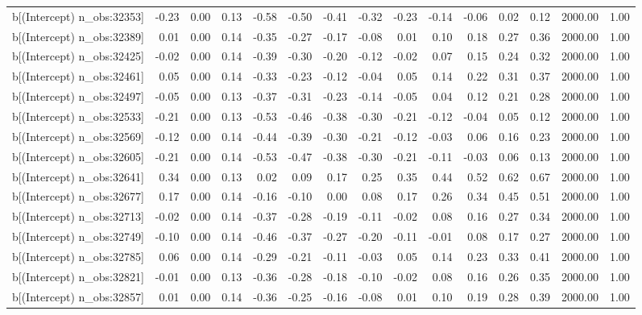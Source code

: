 \begin{table}[ht]
\begin{tabular}{rrrrrrrrrrrrrrr}
  b[(Intercept) n\_obs:32353] & -0.23 & 0.00 & 0.13 & -0.58 & -0.50 & -0.41 & -0.32 & -0.23 & -0.14 & -0.06 & 0.02 & 0.12 & 2000.00 & 1.00 \\ 
  b[(Intercept) n\_obs:32389] & 0.01 & 0.00 & 0.14 & -0.35 & -0.27 & -0.17 & -0.08 & 0.01 & 0.10 & 0.18 & 0.27 & 0.36 & 2000.00 & 1.00 \\ 
  b[(Intercept) n\_obs:32425] & -0.02 & 0.00 & 0.14 & -0.39 & -0.30 & -0.20 & -0.12 & -0.02 & 0.07 & 0.15 & 0.24 & 0.32 & 2000.00 & 1.00 \\ 
  b[(Intercept) n\_obs:32461] & 0.05 & 0.00 & 0.14 & -0.33 & -0.23 & -0.12 & -0.04 & 0.05 & 0.14 & 0.22 & 0.31 & 0.37 & 2000.00 & 1.00 \\ 
  b[(Intercept) n\_obs:32497] & -0.05 & 0.00 & 0.13 & -0.37 & -0.31 & -0.23 & -0.14 & -0.05 & 0.04 & 0.12 & 0.21 & 0.28 & 2000.00 & 1.00 \\ 
  b[(Intercept) n\_obs:32533] & -0.21 & 0.00 & 0.13 & -0.53 & -0.46 & -0.38 & -0.30 & -0.21 & -0.12 & -0.04 & 0.05 & 0.12 & 2000.00 & 1.00 \\ 
  b[(Intercept) n\_obs:32569] & -0.12 & 0.00 & 0.14 & -0.44 & -0.39 & -0.30 & -0.21 & -0.12 & -0.03 & 0.06 & 0.16 & 0.23 & 2000.00 & 1.00 \\ 
  b[(Intercept) n\_obs:32605] & -0.21 & 0.00 & 0.14 & -0.53 & -0.47 & -0.38 & -0.30 & -0.21 & -0.11 & -0.03 & 0.06 & 0.13 & 2000.00 & 1.00 \\ 
  b[(Intercept) n\_obs:32641] & 0.34 & 0.00 & 0.13 & 0.02 & 0.09 & 0.17 & 0.25 & 0.35 & 0.44 & 0.52 & 0.62 & 0.67 & 2000.00 & 1.00 \\ 
  b[(Intercept) n\_obs:32677] & 0.17 & 0.00 & 0.14 & -0.16 & -0.10 & 0.00 & 0.08 & 0.17 & 0.26 & 0.34 & 0.45 & 0.51 & 2000.00 & 1.00 \\ 
  b[(Intercept) n\_obs:32713] & -0.02 & 0.00 & 0.14 & -0.37 & -0.28 & -0.19 & -0.11 & -0.02 & 0.08 & 0.16 & 0.27 & 0.34 & 2000.00 & 1.00 \\ 
  b[(Intercept) n\_obs:32749] & -0.10 & 0.00 & 0.14 & -0.46 & -0.37 & -0.27 & -0.20 & -0.11 & -0.01 & 0.08 & 0.17 & 0.27 & 2000.00 & 1.00 \\ 
  b[(Intercept) n\_obs:32785] & 0.06 & 0.00 & 0.14 & -0.29 & -0.21 & -0.11 & -0.03 & 0.05 & 0.14 & 0.23 & 0.33 & 0.41 & 2000.00 & 1.00 \\ 
  b[(Intercept) n\_obs:32821] & -0.01 & 0.00 & 0.13 & -0.36 & -0.28 & -0.18 & -0.10 & -0.02 & 0.08 & 0.16 & 0.26 & 0.35 & 2000.00 & 1.00 \\ 
  b[(Intercept) n\_obs:32857] & 0.01 & 0.00 & 0.14 & -0.36 & -0.25 & -0.16 & -0.08 & 0.01 & 0.10 & 0.19 & 0.28 & 0.39 & 2000.00 & 1.00 \\ 

\end{tabular}
\end{table}
